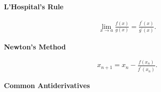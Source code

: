 \documentclass{report}
\begin{document}
     \bigbreak \noindent \bigbreak \noindent 
     \begin{large}
         \textbf{ L'Hospital's Rule}
     \end{large}
     \begin{align*}
         \lim\limits_{x \to a}{\frac{f(x)}{g(x)}} = \frac{f^{\prime}(x)}{g^{\prime}(x)}
     .\end{align*}

     \bigbreak \noindent \bigbreak \noindent 
     \begin{large}
         \textbf{Newton's Method}
     \end{large}
     \begin{align*}
         x_{n+1} = x_{n} - \frac{f(x_{n})}{f^{\prime}(x_{n})}
     .\end{align*}

     \pagebreak \bigbreak \noindent
     \begin{large}
         \textbf{Common Antiderivatives}
     \end{large}
     \bigbreak \noindent \bigbreak \noindent
\end{document}
